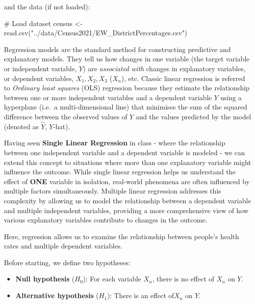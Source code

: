 \documentclass[
  letterpaper,
  DIV=11,
  numbers=noendperiod]{scrreprt}
\newenvironment{Shaded}{\begin{snugshade}}{\end{snugshade}}
\newcommand{\CommentTok}[1]{\textcolor[rgb]{0.37,0.37,0.37}{#1}}
\newcommand{\FunctionTok}[1]{\textcolor[rgb]{0.28,0.35,0.67}{#1}}
\newcommand{\NormalTok}[1]{\textcolor[rgb]{0.00,0.23,0.31}{#1}}
\newcommand{\OtherTok}[1]{\textcolor[rgb]{0.00,0.23,0.31}{#1}}
\newcommand{\StringTok}[1]{\textcolor[rgb]{0.13,0.47,0.30}{#1}}
\providecommand{\tightlist}{%
  \setlength{\itemsep}{0pt}\setlength{\parskip}{0pt}}\usepackage{longtable,booktabs,array}
\begin{document}
and the data (if not loaded):

\begin{Shaded}
\begin{Highlighting}[]
\CommentTok{\# Load dataset}
\NormalTok{census }\OtherTok{\textless{}{-}} \FunctionTok{read.csv}\NormalTok{(}\StringTok{"../data/Census2021/EW\_DistrictPercentages.csv"}\NormalTok{)}
\end{Highlighting}
\end{Shaded}

Regression models are the standard method for constructing predictive
and explanatory models. They tell us how changes in one variable (the
target variable or independent variable, \(Y\)) are \emph{associated
with} changes in explanatory variables, or dependent variables,
\(X_1, X_2, X_3\) (\(X_n\)), etc. Classic linear regression is referred
to \emph{Ordinary least squares} (OLS) regression because they estimate
the relationship between one or more independent variables and a
dependent variable \(Y\) using a hyperplane (i.e.~a multi-dimensional
line) that minimises the sum of the squared difference between the
observed values of \(Y\) and the values predicted by the model (denoted
as \(\hat{Y}\), \(Y\)-hat).

Having seen \textbf{Single Linear Regression} in class - where the
relationship between one independent variable and a dependent variable
is modeled - we can extend this concept to situations where more than
one explanatory variable might influence the outcome. While single
linear regression helps us understand the effect of \textbf{ONE}
variable in isolation, real-world phenomena are often influenced by
multiple factors simultaneously. Multiple linear regression addresses
this complexity by allowing us to model the relationship between a
dependent variable and multiple independent variables, providing a more
comprehensive view of how various explanatory variables contribute to
changes in the outcome.

Here, regression allows us to examine the relationship between people's
health rates and multiple dependent variables.

Before starting, we define two hypotheses:

\begin{itemize}
\tightlist
\item
  \textbf{Null hypothesis} (\(H_0\)): For each variable \(X_n\), there
  is no effect of \(X_n\) on \(Y\).
\item
  \textbf{Alternative hypothesis} (\(H_1\)): There is an effect
  of\(X_n\) on \(Y\).
\end{itemize}
\end{document}
